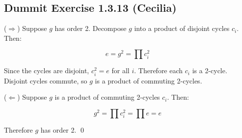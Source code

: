 \subsection*{Dummit Exercise 1.3.13 (Cecilia)}

($\Rightarrow$) Suppose $g$ has order 2. Decompose $g$ into a product of disjoint cycles $c_i$. Then:

\[
  e = g^2 = \prod c_i^2
\]

Since the cycles are disjoint, $c_i^2 = e$ for all $i$. Therefore each $c_i$ is a 2-cycle. Disjoint cycles commute, so $g$ is a product of commuting 2-cycles.

($\Leftarrow$) Suppose $g$ is a product of commuting 2-cycles $c_i$. Then:

\[
  g^2 = \prod c_i^2 = \prod e = e
\]

Therefore $g$ has order 2. \qed
